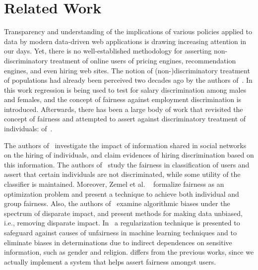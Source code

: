 \section{Related Work}
\label{sect:related}
Transparency and understanding of the implications of various policies applied
to data by modern data-driven web applications is drawing increasing attention
in our days. Yet, there is no well-established methodology for asserting
non-discriminatory treatment of online users of pricing engines,
recommendation engines, and even hiring web sites. The notion of
(non-)discriminatory treatment of populations had already been perceived two decades
ago by the authors of~\cite{EmploymentDisc}. In this work regression is being
used to test for salary discrimination among males and females, and the concept
of fairness against employment discrimination is introduced. Afterwards,
there has been a large body of work that revisited the concept of fairness and
attempted to assert against discriminatory treatment of individuals:
of~\cite{HiringDiscrimination,FairnessAwareness,FairnessRegularization,
FairRepresentation,DisparateImpact}.

The authors of~\cite{HiringDiscrimination} investigate the impact of
information shared in social networks on the hiring of individuals, and claim
evidences of hiring discrimination based on this information. The authors
of~\cite{FairnessAwareness} study the fairness in classification of users and
assert that certain individuals are not discriminated, while some utility
of the classifier is maintained. Moreover, Zemel et al.
~\cite{FairRepresentation} formalize fairness as an optimization problem and
present a technique to achieve both individual and group fairness. Also, the
authors of~\cite{DisparateImpact} examine algorithmic biases under the spectrum
of disparate impact, and present methods for making data unbiased, i.e.,
removing disparate impact. In~\cite{FairnessRegularization} a regularization
technique is presented to safeguard against causes of unfairness in machine
learning techniques and to eliminate biases in determinations due to indirect
dependences on sensitive information, such as gender and religion. \sysname
differs from the previous works, since we actually implement a system that
helps assert fairness amongst users.


